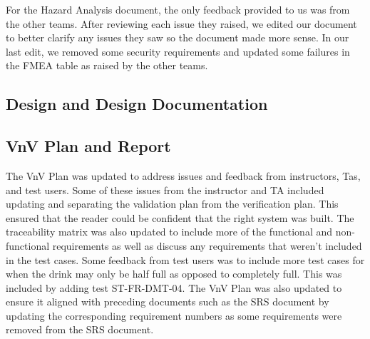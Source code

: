 \documentclass{article}
\begin{document}
For the Hazard Analysis document, the only feedback provided to us was from the other teams. After reviewing each issue they raised, we edited our document to better clarify any issues they saw so the document made more sense. In our last edit, we removed some security requirements and updated some failures in the FMEA table as raised by the other teams.
\subsection{Design and Design Documentation}

\subsection{VnV Plan and Report}
The VnV Plan was updated to address issues and feedback from instructors, Tas, and test users. Some of these issues from the instructor and TA included updating and separating the validation plan from the verification plan. This ensured that the reader could be confident that the right system was built. The traceability matrix was also updated to include more of the functional and non-functional requirements as well as discuss any requirements that weren't included in the test cases. Some feedback from test users was to include more test cases for when the drink may only be half full as opposed to completely full. This was included by adding test ST-FR-DMT-04. The VnV Plan was also updated to ensure it aligned with preceding documents such as the SRS document by updating the corresponding requirement numbers as some requirements were removed from the SRS document.\\

\end{document}

